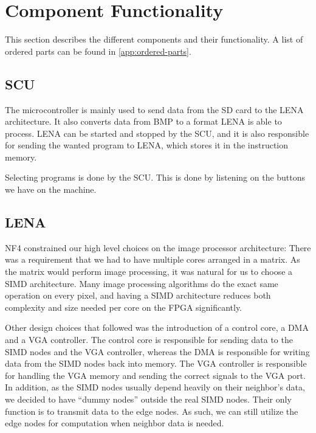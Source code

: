\section{Component Functionality}

This section describes the different components and their functionality. A list
of ordered parts can be found in \ref{app:ordered-parts}.
\subsection{SCU}

The microcontroller is mainly used to send data from the \ac{SD} card to the
\ac{LENA} architecture. It also converts data from \ac{BMP} to a format
\ac{LENA} is able to process.  \ac{LENA} can be started and stopped by the \ac{SCU}, and
it is also responsible for sending the wanted program to \ac{LENA}, which stores
it in the instruction memory.

Selecting programs is done by the \ac{SCU}. This is done by listening on the
buttons we have on the machine.

\subsection{LENA}

NF4 constrained our high level choices on the image processor architecture:
There was a requirement that we had to have multiple cores arranged in a
matrix. As the matrix would perform image processing, it was natural for us to
choose a \ac{SIMD} architecture. Many image processing algorithms do the exact
same operation on every pixel, and having a \ac{SIMD} architecture reduces both
complexity and size needed per core on the \ac{FPGA} significantly.

Other design choices that followed was the introduction of a control core, a
\ac{DMA} and a \ac{VGA} controller. The control core is responsible for sending
data to the \ac{SIMD} nodes and the \ac{VGA} controller, whereas the \ac{DMA} is
responsible for writing data from the \ac{SIMD} nodes back into memory. The
\ac{VGA} controller is responsible for handling the \ac{VGA} memory and sending
the correct signals to the \ac{VGA} port. In addition, as the \ac{SIMD} nodes
usually depend heavily on their neighbor's data, we decided to have ``dummy
nodes'' outside the real \ac{SIMD} nodes. Their only function is to transmit
data to the edge nodes. As such, we can still utilize the edge nodes for
computation when neighbor data is needed.

